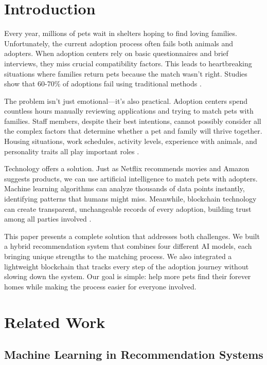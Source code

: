 \documentclass[conference]{IEEEtran}
\begin{document}
\section{Introduction}

Every year, millions of pets wait in shelters hoping to find loving families. Unfortunately, the current adoption process often fails both animals and adopters. When adoption centers rely on basic questionnaires and brief interviews, they miss crucial compatibility factors. This leads to heartbreaking situations where families return pets because the match wasn't right. Studies show that 60-70\% of adoptions fail using traditional methods \cite{petadoption2023}.

The problem isn't just emotional—it's also practical. Adoption centers spend countless hours manually reviewing applications and trying to match pets with families. Staff members, despite their best intentions, cannot possibly consider all the complex factors that determine whether a pet and family will thrive together. Housing situations, work schedules, activity levels, experience with animals, and personality traits all play important roles \cite{animalwelfare2023}.

Technology offers a solution. Just as Netflix recommends movies and Amazon suggests products, we can use artificial intelligence to match pets with adopters. Machine learning algorithms can analyze thousands of data points instantly, identifying patterns that humans might miss. Meanwhile, blockchain technology can create transparent, unchangeable records of every adoption, building trust among all parties involved \cite{aiapplications2024}.

This paper presents a complete solution that addresses both challenges. We built a hybrid recommendation system that combines four different AI models, each bringing unique strengths to the matching process. We also integrated a lightweight blockchain that tracks every step of the adoption journey without slowing down the system. Our goal is simple: help more pets find their forever homes while making the process easier for everyone involved.

\section{Related Work}

\subsection{Machine Learning in Recommendation Systems}
\end{document}
